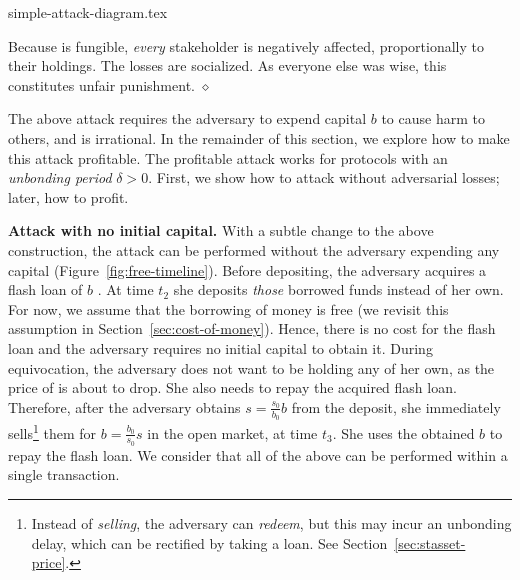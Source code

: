 {simple-attack-diagram.tex}


Because \stasset is fungible, \emph{every} stakeholder is negatively affected,
proportionally to their holdings.
The losses are socialized. As everyone else was
wise, this constitutes unfair punishment.
\hfill
$\diamond$


The above attack requires the adversary to expend capital $b$ to cause
harm to others, and is irrational. In the remainder of this section, we
explore how to make this attack profitable. The profitable attack works
for protocols with an \emph{unbonding period} $\delta > 0$. First, we show
how to attack without adversarial losses; later, how to profit.

\noindent
\textbf{Attack with no initial capital.}
With a subtle change to the above construction, the attack can be
performed without the adversary expending any capital (Figure~\ref{fig:free-timeline}).
Before depositing, the
adversary acquires a flash loan of $b$ \asset. At time $t_2$ she deposits \emph{those}
borrowed funds instead of her own.
For now, we assume that the borrowing of money is free (we
revisit this assumption in Section~\ref{sec:cost-of-money}).
Hence, there is no cost for the flash loan and the adversary
requires no initial capital to obtain it.
During equivocation, the adversary does not want to be holding any
\stasset of her own, as the price of \stasset is about to drop. She also
needs to repay the acquired flash loan.
Therefore, after the adversary obtains $s = \frac{s_0}{b_0} b$ \stasset
from the deposit, she immediately sells\footnote{Instead of \emph{selling}, the
adversary can \emph{redeem}, but this may incur an unbonding delay, which can
be rectified by taking a loan.  See Section~\ref{sec:stasset-price}.} them
for $b = \frac{b_0}{s_0} s$ \asset in the open market, at time $t_3$.
She uses the obtained $b$ \asset to
repay the flash loan. We consider that all
of the above can be performed within a single transaction.

